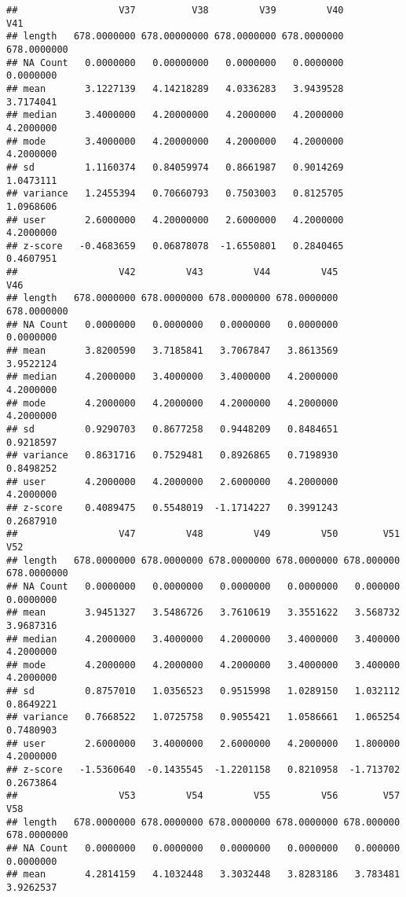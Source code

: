 \documentclass{article}
\begin{document}
\begin{verbatim}
##                  V37          V38         V39         V40         V41
## length   678.0000000 678.00000000 678.0000000 678.0000000 678.0000000
## NA Count   0.0000000   0.00000000   0.0000000   0.0000000   0.0000000
## mean       3.1227139   4.14218289   4.0336283   3.9439528   3.7174041
## median     3.4000000   4.20000000   4.2000000   4.2000000   4.2000000
## mode       3.4000000   4.20000000   4.2000000   4.2000000   4.2000000
## sd         1.1160374   0.84059974   0.8661987   0.9014269   1.0473111
## variance   1.2455394   0.70660793   0.7503003   0.8125705   1.0968606
## user       2.6000000   4.20000000   2.6000000   4.2000000   4.2000000
## z-score   -0.4683659   0.06878078  -1.6550801   0.2840465   0.4607951
##                  V42         V43         V44         V45         V46
## length   678.0000000 678.0000000 678.0000000 678.0000000 678.0000000
## NA Count   0.0000000   0.0000000   0.0000000   0.0000000   0.0000000
## mean       3.8200590   3.7185841   3.7067847   3.8613569   3.9522124
## median     4.2000000   3.4000000   3.4000000   4.2000000   4.2000000
## mode       4.2000000   4.2000000   4.2000000   4.2000000   4.2000000
## sd         0.9290703   0.8677258   0.9448209   0.8484651   0.9218597
## variance   0.8631716   0.7529481   0.8926865   0.7198930   0.8498252
## user       4.2000000   4.2000000   2.6000000   4.2000000   4.2000000
## z-score    0.4089475   0.5548019  -1.1714227   0.3991243   0.2687910
##                  V47         V48         V49         V50        V51         V52
## length   678.0000000 678.0000000 678.0000000 678.0000000 678.000000 678.0000000
## NA Count   0.0000000   0.0000000   0.0000000   0.0000000   0.000000   0.0000000
## mean       3.9451327   3.5486726   3.7610619   3.3551622   3.568732   3.9687316
## median     4.2000000   3.4000000   4.2000000   3.4000000   3.400000   4.2000000
## mode       4.2000000   4.2000000   4.2000000   3.4000000   3.400000   4.2000000
## sd         0.8757010   1.0356523   0.9515998   1.0289150   1.032112   0.8649221
## variance   0.7668522   1.0725758   0.9055421   1.0586661   1.065254   0.7480903
## user       2.6000000   3.4000000   2.6000000   4.2000000   1.800000   4.2000000
## z-score   -1.5360640  -0.1435545  -1.2201158   0.8210958  -1.713702   0.2673864
##                  V53         V54         V55         V56        V57         V58
## length   678.0000000 678.0000000 678.0000000 678.0000000 678.000000 678.0000000
## NA Count   0.0000000   0.0000000   0.0000000   0.0000000   0.000000   0.0000000
## mean       4.2814159   4.1032448   3.3032448   3.8283186   3.783481   3.9262537

\end{verbatim}
\end{document}
